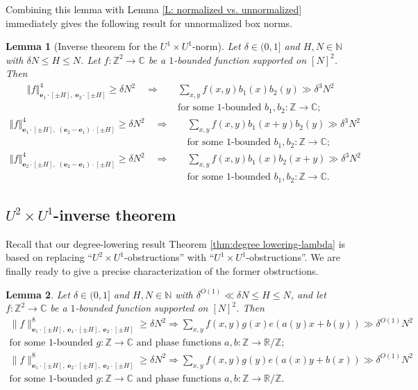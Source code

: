 \documentclass[11pt]{amsart}
\newtheorem{lemma}{Lemma}[section]
\theoremstyle{definition}
\newcommand{\C}{{\mathbb C}}
\newcommand{\N}{{\mathbb N}}
\newcommand{\R}{{\mathbb R}}
\newcommand{\Z}{{\mathbb Z}}
\newcommand{\be}{{\mathbf{e}}}
\newcommand{\norm}[1]{\left\Vert #1\right\Vert}
\begin{document}
Combining this lemma with Lemma \ref{L: normalized vs. unnormalized} immediately gives the following result for unnormalized box norms.
\begin{lemma}[Inverse theorem for the $U^1\times U^1$-norm]\label{L: U1xU1 inverse}
Let $\delta\in(0, 1]$ and $H, N\in\N$ with $\delta N\leq H\leq N$.  Let $f: \Z^2 \to \mathbb{C}$ be a $1$-bounded function supported on $[N]^2$.  Then
\begin{align*}
\norm{f}_{\be_1\cdot[\pm H],\; \be_2\cdot[\pm H]}^4\geq \delta N^{2} \quad \Longrightarrow\quad &\sum_{x,y}f(x,y)b_1(x)b_2(y)\gg \delta^3 N^2\\
 &\text{for some $1$-bounded $b_1,b_2: \Z \to \C$};
\end{align*}
\begin{align*}
\norm{f}_{\be_1\cdot[\pm H],\; (\be_2-\be_1)\cdot[\pm H]}^4\geq \delta N^{2} \quad \Longrightarrow\quad &\sum_{x,y}f(x,y)b_1(x+y)b_2(y)\gg \delta^3 N^2\\
 &\text{for some $1$-bounded $b_1,b_2: \Z \to \C$};
\end{align*}
\begin{align*}
\norm{f}_{\be_2\cdot[\pm H],\; (\be_2-\be_1)\cdot[\pm H]}^4\geq \delta N^{2} \quad \Longrightarrow\quad &\sum_{x,y}f(x,y)b_1(x)b_2(x+y)\gg \delta^3 N^2\\
 &\text{for some $1$-bounded $b_1,b_2: \Z \to \C$}.
\end{align*}
\end{lemma}





\subsection{$U^2 \times U^1$-inverse theorem}
Recall that our degree-lowering result Theorem \ref{thm:degree lowering-lambda} is based on replacing ``$U^2 \times U^1$-obstructions'' with ``$U^1 \times U^1$-obstructions''.  We are finally ready to give a precise characterization of the former obstructions.

\begin{lemma}\label{L: U^2 x U^1 inverse}
Let $\delta\in(0, 1]$ and $H, N\in\N$ with $\delta^{O(1)}\ll\delta N\leq H\leq N$, and let $f: \Z^2 \to \mathbb{C}$ be a $1$-bounded function supported on $[N]^2$.  Then
\begin{align*}
\|f\|_{\be_1\cdot[\pm H],\; \be_1\cdot[\pm H],\; \be_2\cdot[\pm H]}^8 \geq \delta N^2 \Longrightarrow \sum_{x,y}f(x,y)g(x)e(a(y)x+b(y)) \gg\delta^{O(1)} N^2\\
 \text{for some $1$-bounded $g: \Z \to \C$ and phase functions $a,b: \Z \to \R/\Z$};
\end{align*}
\begin{align*}
\|f\|_{\be_1\cdot[\pm H],\; \be_2\cdot[\pm H],\; \be_2\cdot[\pm H]}^8 \geq \delta N^2 \Longrightarrow \sum_{x,y}f(x,y)g(y)e(a(x)y+b(x)) \gg\delta^{O(1)} N^2\\
\text{for some $1$-bounded $g: \Z \to \C$ and phase functions $a,b: \Z \to \R/\Z$}.
\end{align*}
\end{lemma}
\end{document}
